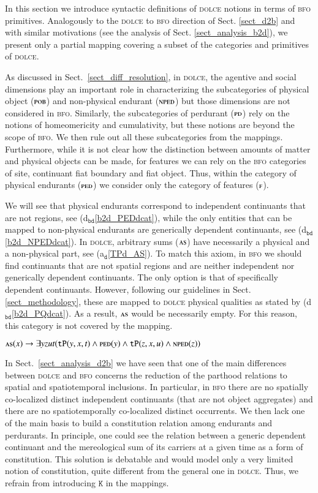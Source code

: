\documentclass[ao]{iosart2x}
\newcommand{\bflist}{\begin{list}{}{\setlength{\topsep}{2mm}\setlength{\parsep}{0mm}\setlength{\leftmargin}{9.2mm}\setlength{\labelwidth}{8mm}}}
\newcommand{\eflist}{\end{list}}
\newcommand{\dolceAxLabel}{\textrm{a$_\texttt{d}$}}
\newcommand{\bdDefLabel}{\textrm{d$_\texttt{bd}$}}
\newcounter{cntax}
\newcommand{\dolceax}[1]{\refstepcounter{cntax}\begin{small}{\bf \dolceAxLabel\thecntax\label{#1}}\end{small}}
\newcommand{\refdolceax}[1]{({\dolceAxLabel}\ref{#1})}
\newcommand{\refbddf}[1]{({\bdDefLabel}\ref{#1})}
\newcommand{\pr}[1]{\mathtt{#1}}
\newcommand{\dolce}{{\textsc{dolce}}}
\newcommand{\bfo}{{\textsc{bfo}}}
\newcommand {\ASdcat} {\textsc{as}}
\newcommand {\Fdcat} {\textsc{f}}
\newcommand {\NPEDdcat} {\textsc{nped}}
\newcommand {\PDdcat} {\textsc{pd}}
\newcommand {\PEDdcat} {\textsc{ped}}
\newcommand {\POBdcat} {\textsc{pob}}
\newcommand {\TPd} {\ensuremath{\pr{tP}}}
\newcommand {\Kd} {\ensuremath{\pr{K}}}
\begin{document}
In this section we introduce syntactic definitions of {\dolce} notions in terms of {\bfo} primitives. Analogously to the {\dolce} to {\bfo} direction of Sect. \ref{sect_d2b} and with similar motivations (see the analysis of Sect. \ref{sect_analysis_b2d}), we present only a partial mapping covering a subset of the categories and primitives of {\dolce}.  

As discussed in Sect.~\ref{sect_diff_resolution}, in {\dolce}, the agentive and social dimensions play an important role in characterizing the subcategories of physical object ($\POBdcat$) and non-physical endurant ($\NPEDdcat$) but those dimensions are not considered in {\bfo}. Similarly, the subcategories of perdurant ($\PDdcat$) rely on the notions of homeomericity and cumulativity, but these notions are beyond the scope of {\bfo}. We then rule out all these subcategories from the mappings. Furthermore, while it is not clear how the distinction between amounts of matter and physical objects can be made, for features we can rely on the {\bfo} categories of site, continuant fiat boundary and fiat object. Thus, within the category of physical endurants ($\PEDdcat$) we consider only the category of features ($\Fdcat$). 

We will see that physical endurants correspond to independent continuants that are not regions,
see \refbddf{b2d_PEDdcat}, while the only entities that can be mapped to non-physical endurants are generically dependent continuants, see \refbddf{b2d_NPEDdcat}. In {\dolce}, arbitrary sums ($\ASdcat$) have necessarily a physical and a non-physical part, see \refdolceax{TPd_AS}. To match this axiom, in {\bfo} we should find continuants that are not spatial regions and are neither independent nor generically dependent continuants. The only option is that of specifically dependent continuants. However, following our guidelines in Sect. \ref{sect_methodology}, these are mapped to {\dolce} physical qualities as stated by \refbddf{b2d_PQdcat}. As a result, $\ASdcat$ would be necessarily empty. For this reason, this category is not covered by the mapping.   
%
\bflist
\item[\dolceax{TPd_AS}] $\ASdcat(x) \to \exists yzut(\TPd(y,x,t) \land \PEDdcat(y) \land \TPd(z,x,u) \land \NPEDdcat(z))$  
\eflist

In Sect.~\ref{sect_analysis_d2b} we have seen that one of the main differences between {\dolce} and {\bfo} concerns the reduction of the parthood relations to spatial and spatiotemporal inclusions. In particular, in {\bfo} there are no spatially co-localized distinct independent continuants (that are not object aggregates) and there are no spatiotemporally co-localized distinct occurrents. We then lack one of the main basis to build a constitution relation among endurants and perdurants. In principle, one could see the relation between a generic dependent continuant and the mereological sum of its carriers at a given time as a form of constitution. This solution is debatable and would model only a very limited notion of constitution, quite different from the general one in {\dolce}. Thus, we refrain from introducing $\Kd$ in the mappings.  
\end{document}
